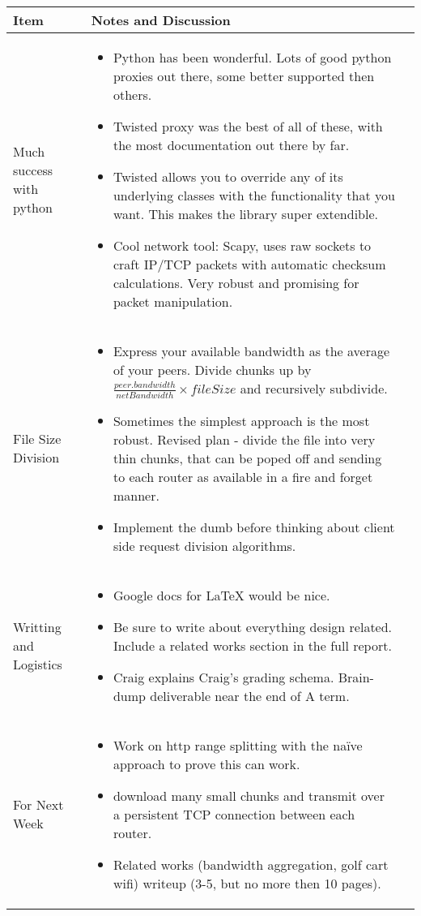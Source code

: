 \documentclass[a4wide,10pt]{extarticle}
\begin{document}
\vspace{0.5cm}
\begin{center}
\begin{tabular}{| m{3.0cm} | m{12.6cm} | m{2cm}|} \hline
\textbf{Item} & \textbf{Notes and Discussion}\\ \hline

Much success with python & 
	\begin{itemize}
		\item Python has been wonderful. Lots of good python proxies out there, some better supported then others.
		\item Twisted proxy was the best of all of these, with the most documentation out there by far. 
		\item Twisted allows you to override any of its underlying classes with the functionality that you want. This makes the library super extendible.
		\item Cool network tool: Scapy, uses raw sockets to craft IP/TCP packets with automatic checksum calculations. Very robust and promising for packet manipulation. 
	\end{itemize} 
\\ \hline
File Size Division &
	\begin{itemize}
		\item Express your available bandwidth as the average of your peers. Divide chunks up by $\frac{peer.bandwidth}{netBandwidth} \times{fileSize}$ and recursively subdivide.
		\item Sometimes the simplest approach is the most robust. Revised plan - divide the file into very thin chunks, that can be poped off and sending to each router as available in a fire and forget manner.
		\item Implement the dumb before thinking about client side request division algorithms.
	\end{itemize}
\\ \hline
Writting and Logistics &
	\begin{itemize}
		\item Google docs for LaTeX would be nice.
		\item Be sure to write about everything design related. Include a related works section in the full report.
		\item Craig explains Craig's grading schema. Brain-dump deliverable near the end of A term.
	\end{itemize}
\\ \hline

For Next Week &
	\begin{itemize}
		\item Work on http range splitting with the na\"{i}ve approach to prove this can work.
		\item download many small chunks and transmit over a persistent TCP connection between each router.
		\item Related works (bandwidth aggregation, golf cart wifi) writeup (3-5, but no more then 10 pages).
	\end{itemize}
\\ \hline

\end{tabular}
\end{center}
\end{document}
